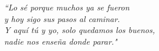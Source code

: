 \cleardoublepage

\thispagestyle{empty}
\null\vfill

\begin{flushright}
\parbox{8cm}{
  \raggedright{\large\itshape
   ``Lo s\'{e} porque muchos ya se fueron \\ 
  y hoy sigo sus pasos al caminar. \\
  Y aqu\'{i} t\'{u} y yo, solo quedamos los buenos, \\ 
  nadie nos ense\~{n}a donde parar."\par\bigskip
  }   
  \par
}
\end{flushright}

\vfill\vfill

\clearpage
